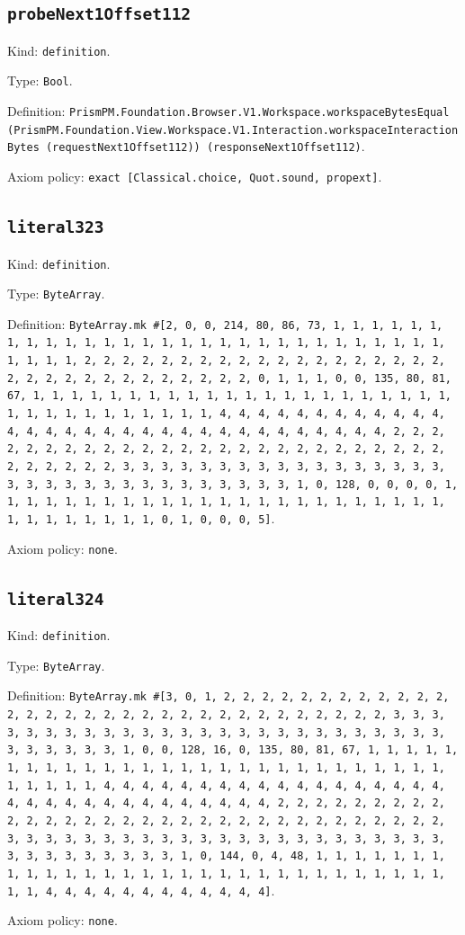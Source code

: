 \documentclass[11pt]{article}
\begin{document}
\subsection*{\texttt{probeNext1Offset112}}
\noindent Kind: \texttt{definition}.\par
\noindent Type: \texttt{Bool}.\par
\noindent Definition: \texttt{PrismPM.Foundation.Browser.V1.Workspace.workspaceBytesEqual (PrismPM.Foundation.View.Workspace.V1.Interaction.workspaceInteractionBytes (requestNext1Offset112)) (responseNext1Offset112)}.\par
\noindent Axiom policy: \texttt{exact [Classical.choice, Quot.sound, propext]}.\par
\subsection*{\texttt{literal323}}
\noindent Kind: \texttt{definition}.\par
\noindent Type: \texttt{ByteArray}.\par
\noindent Definition: \texttt{ByteArray.mk \#[2, 0, 0, 214, 80, 86, 73, 1, 1, 1, 1, 1, 1, 1, 1, 1, 1, 1, 1, 1, 1, 1, 1, 1, 1, 1, 1, 1, 1, 1, 1, 1, 1, 1, 1, 1, 1, 1, 1, 1, 2, 2, 2, 2, 2, 2, 2, 2, 2, 2, 2, 2, 2, 2, 2, 2, 2, 2, 2, 2, 2, 2, 2, 2, 2, 2, 2, 2, 2, 2, 2, 2, 0, 1, 1, 1, 0, 0, 135, 80, 81, 67, 1, 1, 1, 1, 1, 1, 1, 1, 1, 1, 1, 1, 1, 1, 1, 1, 1, 1, 1, 1, 1, 1, 1, 1, 1, 1, 1, 1, 1, 1, 1, 1, 1, 4, 4, 4, 4, 4, 4, 4, 4, 4, 4, 4, 4, 4, 4, 4, 4, 4, 4, 4, 4, 4, 4, 4, 4, 4, 4, 4, 4, 4, 4, 4, 4, 2, 2, 2, 2, 2, 2, 2, 2, 2, 2, 2, 2, 2, 2, 2, 2, 2, 2, 2, 2, 2, 2, 2, 2, 2, 2, 2, 2, 2, 2, 2, 2, 3, 3, 3, 3, 3, 3, 3, 3, 3, 3, 3, 3, 3, 3, 3, 3, 3, 3, 3, 3, 3, 3, 3, 3, 3, 3, 3, 3, 3, 3, 3, 3, 1, 0, 128, 0, 0, 0, 0, 1, 1, 1, 1, 1, 1, 1, 1, 1, 1, 1, 1, 1, 1, 1, 1, 1, 1, 1, 1, 1, 1, 1, 1, 1, 1, 1, 1, 1, 1, 1, 1, 0, 1, 0, 0, 0, 5]}.\par
\noindent Axiom policy: \texttt{none}.\par
\subsection*{\texttt{literal324}}
\noindent Kind: \texttt{definition}.\par
\noindent Type: \texttt{ByteArray}.\par
\noindent Definition: \texttt{ByteArray.mk \#[3, 0, 1, 2, 2, 2, 2, 2, 2, 2, 2, 2, 2, 2, 2, 2, 2, 2, 2, 2, 2, 2, 2, 2, 2, 2, 2, 2, 2, 2, 2, 2, 2, 2, 2, 3, 3, 3, 3, 3, 3, 3, 3, 3, 3, 3, 3, 3, 3, 3, 3, 3, 3, 3, 3, 3, 3, 3, 3, 3, 3, 3, 3, 3, 3, 3, 3, 1, 0, 0, 128, 16, 0, 135, 80, 81, 67, 1, 1, 1, 1, 1, 1, 1, 1, 1, 1, 1, 1, 1, 1, 1, 1, 1, 1, 1, 1, 1, 1, 1, 1, 1, 1, 1, 1, 1, 1, 1, 1, 1, 4, 4, 4, 4, 4, 4, 4, 4, 4, 4, 4, 4, 4, 4, 4, 4, 4, 4, 4, 4, 4, 4, 4, 4, 4, 4, 4, 4, 4, 4, 4, 4, 2, 2, 2, 2, 2, 2, 2, 2, 2, 2, 2, 2, 2, 2, 2, 2, 2, 2, 2, 2, 2, 2, 2, 2, 2, 2, 2, 2, 2, 2, 2, 2, 3, 3, 3, 3, 3, 3, 3, 3, 3, 3, 3, 3, 3, 3, 3, 3, 3, 3, 3, 3, 3, 3, 3, 3, 3, 3, 3, 3, 3, 3, 3, 3, 1, 0, 144, 0, 4, 48, 1, 1, 1, 1, 1, 1, 1, 1, 1, 1, 1, 1, 1, 1, 1, 1, 1, 1, 1, 1, 1, 1, 1, 1, 1, 1, 1, 1, 1, 1, 1, 1, 4, 4, 4, 4, 4, 4, 4, 4, 4, 4, 4, 4]}.\par
\noindent Axiom policy: \texttt{none}.\par
\end{document}
